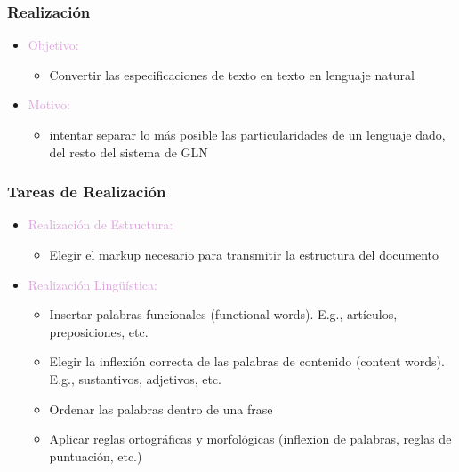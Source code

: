 \documentclass[compress,color=usenames]{beamer}
\newcommand{\mH}[1]{\textcolor{Plum}{#1}}
\begin{document}
\begin{frame}
\frametitle{Realizaci\'on}

\label{f23}
\begin{itemize}
\item {\mH{Objetivo: }}
\begin{itemize}
\item Convertir las especificaciones de texto en texto en lenguaje natural
\end{itemize}
\item {\mH{Motivo: }}
\begin{itemize}
\item intentar separar lo m\'as posible las particularidades de un lenguaje dado, del resto del sistema de GLN
\end{itemize}
\end{itemize}
\end{frame}

\begin{frame}
\frametitle{Tareas de Realizaci\'on}

\begin{itemize}
\item {\mH{Realizaci\'on de Estructura:}}
  \begin{itemize}
  \item Elegir el markup necesario para transmitir la estructura del documento
  \end{itemize}
\item {\mH{Realizaci\'on Ling\"u\'istica:}}
\begin{itemize}
\item Insertar palabras funcionales (functional words). E.g., art\'iculos, preposiciones, etc.
\item Elegir la inflexi\'on correcta de las palabras de contenido (content words). E.g., sustantivos, adjetivos, etc.
\item Ordenar las palabras dentro de una frase
\item Aplicar reglas ortogr\'aficas y morfol\'ogicas (inflexion de palabras, reglas de puntuaci\'on, etc.)

\end{itemize}
\end{itemize}
\end{frame}
\end{document}
